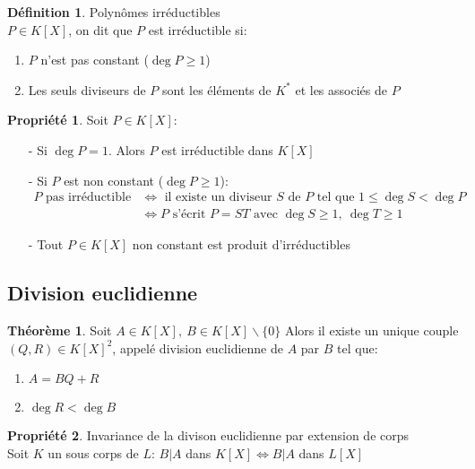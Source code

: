 \documentclass[fleqn]{article}
\theoremstyle{definition} \newtheorem*{defi}{D\'efinition}
\theoremstyle{definition} \newtheorem*{theo}{Th\'eor\`eme}
\theoremstyle{definition} \newtheorem*{coro}{Corollaire}
\theoremstyle{definition} \newtheorem*{nota}{Notation}
\theoremstyle{remark} \newtheorem*{rqs}{Remarques}
\theoremstyle{definition} \newtheorem*{prop}{Propri\'et\'e}
\begin{document}
\begin{defi} Polyn\^omes irr\'eductibles \\
	$P \in K[X]$, on dit que $P$ est irr\'eductible si:
	\begin{enumerate}
		\item $P$ n'est pas constant ($\deg P \geq 1$)
		\item Les seuls diviseurs de $P$ sont les \'el\'ements de $K^*$ et les associ\'es de $P$
	\end{enumerate}
\end{defi}

\begin{prop} Soit $P \in K[X]$:
	\begin{itemize}
		\item [-] Si $\deg P = 1$. Alors $P$ est irr\'eductible dans $K[X]$
		\item [-] Si $P$ est non constant ($\deg P \geq 1$):
			\begin{align*} P \text{ pas irr\'eductible } &\Leftrightarrow \text{ il existe un diviseur } S \text{ de } P \text{ tel que }
			 1 \leq \deg S < \deg P \\
			&\Leftrightarrow P \text{ s'\'ecrit } P = ST \text{ avec } \deg S \geq 1,\ \deg T \geq 1 \end{align*}
		\item [-] Tout $P \in K[X]$ non constant est produit d'irr\'eductibles
	\end{itemize}
\end{prop}

\subsection{Division euclidienne}
\begin{theo} Soit $A \in K[X],\ B \in K[X]\backslash \{0\}$
	Alors il existe un unique couple $(Q,R) \in K[X]^2$, appel\'e division euclidienne de $A$ par $B$ tel que:
	\begin{enumerate}
		\item $A = BQ + R$
		\item $\deg R < \deg B$
	\end{enumerate}
\end{theo}

\begin{prop} Invariance de la divison euclidienne par extension de corps \\
	Soit $K$ un sous corps de $L$:
	$B | A$ dans $K[X] \Leftrightarrow B | A$ dans $L[X]$
\end{prop}
\end{document}
